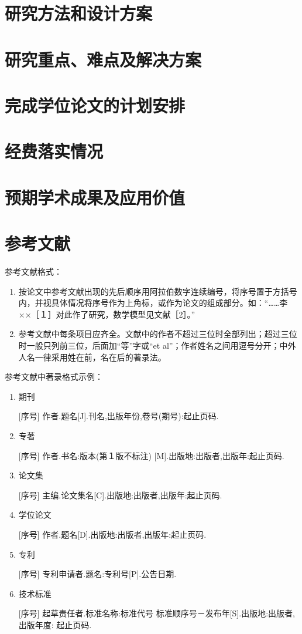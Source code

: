 \documentclass{suesreport}
\begin{document}
    \section{研究方法和设计方案}
    \section{研究重点、难点及解决方案}
    \section{完成学位论文的计划安排}
    \section{经费落实情况}
    \section{预期学术成果及应用价值}
    \section{参考文献}

    参考文献格式：
    \begin{enumerate}[label=\arabic*. ]
        \item 按论文中参考文献出现的先后顺序用阿拉伯数字连续编号，将序号置于方括号内，并视具体情况将序号作为上角标，或作为论文的组成部分。如：“……李××［１］对此作了研究，数学模型见文献［2］。”
        \item 参考文献中每条项目应齐全。文献中的作者不超过三位时全部列出；超过三位时一般只列前三位，后面加“等”字或“et al”；作者姓名之间用逗号分开；中外人名一律采用姓在前，名在后的著录法。
    \end{enumerate}

    
    参考文献中著录格式示例：
    \begin{enumerate}[label=（\arabic*） ]
        \item 期刊
        
        [序号] 作者.题名[J].刊名,出版年份,卷号(期号):起止页码.
        \item 专著
        
        [序号] 作者.书名:版本(第１版不标注) [M].出版地:出版者,出版年:起止页码.

        \item 论文集
        
        [序号] 主编.论文集名[C].出版地:出版者,出版年:起止页码.

        \item 学位论文
        
        [序号] 作者.题名[D].出版地:出版者,出版年:起止页码.

        \item 专利
        
        [序号] 专利申请者.题名:专利号[P].公告日期.

        \item 技术标准
        
        [序号] 起草责任者.标准名称:标准代号 标准顺序号－发布年[S].出版地:出版者,出版年度: 起止页码.
    \end{enumerate}
\end{document}
